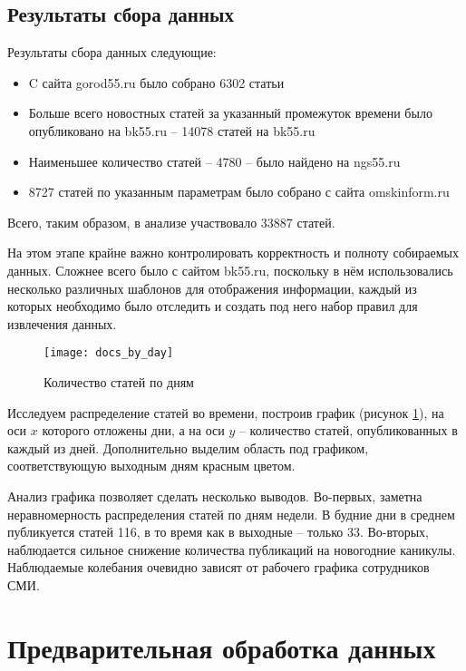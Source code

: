\subsection{Результаты сбора данных}

Результаты сбора данных следующие:
\begin{itemize}
\item C сайта gorod55.ru было собрано 6302 статьи
\item Больше всего новостных статей за указанный промежуток времени было опубликовано на bk55.ru -- 14078 статей на bk55.ru
\item Наименьшее количество статей -- 4780 -- было найдено на ngs55.ru
\item 8727 статей по указанным параметрам было собрано с сайта omskinform.ru
\end{itemize}
Всего, таким образом, в анализе участвовало 33887 статей.

На этом этапе крайне важно контролировать корректность и полноту собираемых данных. Сложнее всего было с сайтом bk55.ru, поскольку в нём использовались несколько различных шаблонов для отображения информации, каждый из которых необходимо было отследить и создать под него набор правил для извлечения данных.

\begin{figure}[h!]
	\centering
	\texttt{[image: docs\_by\_day]}
	\caption{Количество статей по дням}
	\label{fig:docs_by_day}
\end{figure}

Исследуем распределение статей во времени, построив график (рисунок \ref{fig:docs_by_day}), на оси $x$ которого отложены дни, а на оси $y$ -- количество статей, опубликованных в каждый из дней. Дополнительно выделим область под графиком, соответствующую выходным дням красным цветом.

Анализ графика позволяет сделать несколько выводов. Во-первых, заметна неравномерность распределения статей по дням недели. В будние дни в среднем публикуется статей 116, в то время как в выходные -- только 33. Во-вторых, наблюдается сильное снижение количества публикаций на новогодние каникулы. Наблюдаемые колебания очевидно зависят от рабочего графика сотрудников СМИ.

\section{Предварительная обработка данных}

